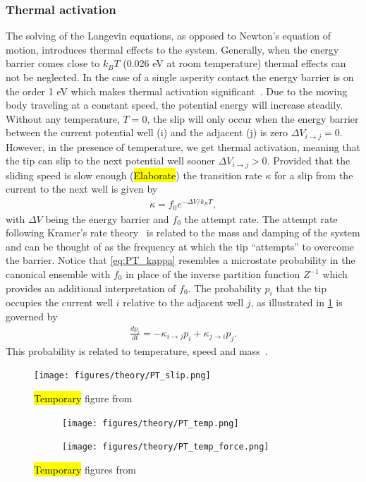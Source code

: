 \subsubsection{Thermal activation}
The solving of the Langevin equations, as opposed to Newton's equation of motion, introduces thermal effects to the system. Generally, when the energy barrier comes close to $k_B T$ (0.026 eV at room temperature) thermal effects can not be neglected. In the case of a single asperity contact the energy barrier is on the order 1 eV which makes thermal activation significant~\cite{Yalin_2011}. Due to the moving body traveling at a constant speed, the potential energy will increase steadily. Without any temperature, $T = 0$, the slip will only occur when the energy barrier between the current potential well (i) and the adjacent (j) is zero $\Delta V_{i\to j} = 0$. However, in the presence of temperature, we get thermal activation, meaning that the tip can slip to the next potential well sooner $\Delta V_{i\to j} > 0$. Provided that the sliding speed is slow enough (\hl{Elaborate}) the transition rate $\kappa$ for a slip from the current to the next well is given by
\begin{align}
  \kappa = f_0 e^{-\Delta V / k_B T},
  \label{eq:PT_kappa}
\end{align}
with $\Delta V$ being the energy barrier and $f_0$ the attempt rate. The attempt rate following Kramer’s rate theory~\cite{RevModPhys.62.251} is related to the mass and damping of the system and can be thought of as the frequency at which the tip ``attempts'' to overcome the barrier. Notice that \cref{eq:PT_kappa} resembles a microstate probability in the canonical ensemble with $f_0$ in place of the inverse partition function $Z^{-1}$ which provides an additional interpretation of $f_0$. The probability $p_i$ that the tip occupies the current well $i$ relative to the adjacent well $j$, as illustrated in \cref{fig:PT_slip} is governed by 
\begin{align*}
  \frac{dp_i}{dt} = -\kappa_{i\to j}p_i + \kappa_{j\to i}p_j.
\end{align*}
This probability is related to temperature, speed and mass~\cite{Yalin_2011}.

\begin{figure}[H]
  \centering
  \texttt{[image: figures/theory/PT\_slip.png]}
  \caption{\hl{Temporary} figure from~\cite{Yalin_2011}}
  \label{fig:PT_slip}
\end{figure}


\begin{figure}[H]
  \centering
  \begin{subfigure}[t]{0.49\textwidth}
      \centering
      \texttt{[image: figures/theory/PT\_temp.png]}
      \caption{}
      \label{fig:PT_temp_a}
  \end{subfigure}
  \hfill
  \begin{subfigure}[t]{0.49\textwidth}
      \centering
      \texttt{[image: figures/theory/PT\_temp\_force.png]}
      \caption{}
      \label{fig:PT_temp_b}
  \end{subfigure}
  \hfill
  \hfill
     \caption{\hl{Temporary} figures from~\cite{Yalin_2011}}
     \label{fig:PT_temp}
\end{figure}

